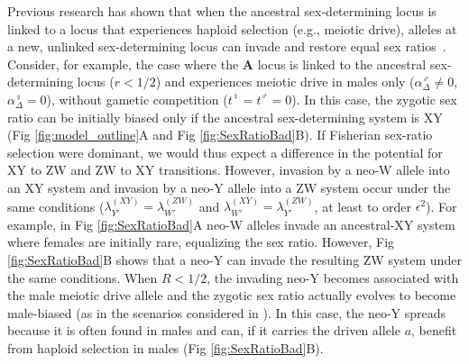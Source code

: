 \documentclass[10pt,letterpaper]{article}
\begin{document}
Previous research has shown that when the ancestral sex-determining locus is linked to a locus that experiences haploid selection (e.g., meiotic drive), alleles at a new, unlinked sex-determining locus can invade and restore equal sex ratios~\cite{Kozielska:2010vm,Ubeda:2015fx}. 
Consider, for example, the case where the $\mathbf{A}$ locus is linked to the ancestral sex-determining locus ($r<1/2$) and experiences meiotic drive in males only ($\alpha^\male_\Delta \neq 0$, $\alpha^\female_\Delta=0$), without gametic competition ($t^\female=t^\male=0$).
In this case, the zygotic sex ratio can be initially biased only if the ancestral sex-determining system is XY (Fig \ref{fig:model_outline}A and Fig \ref{fig:SexRatioBad}B). 
If Fisherian sex-ratio selection were dominant, we would thus expect a difference in the potential for XY to ZW and ZW to XY transitions. 
However, invasion by a neo-W allele into an XY system and invasion by a neo-Y allele into a ZW system occur under the same conditions ($\lambda_{Y'}^{(XY)} = \lambda_{W'}^{(ZW)}$ and $\lambda_{W'}^{(XY)}=\lambda_{Y'}^{(ZW)}$, at least to order $\epsilon^2$).
For example, in Fig \ref{fig:SexRatioBad}A neo-W alleles invade an ancestral-XY system where females are initially rare, equalizing the sex ratio.
However, Fig \ref{fig:SexRatioBad}B shows that a neo-Y can invade the resulting ZW system under the same conditions. 
When $R<1/2$, the invading neo-Y becomes associated with the male meiotic drive allele and the zygotic sex ratio actually evolves to become male-biased (as in the scenarios considered in \cite{Kozielska:2010vm,Ubeda:2015fx}).
In this case, the neo-Y spreads because it is often found in males and can, if it carries the driven allele $a$, benefit from haploid selection in males (Fig \ref{fig:SexRatioBad}B).
\end{document}
